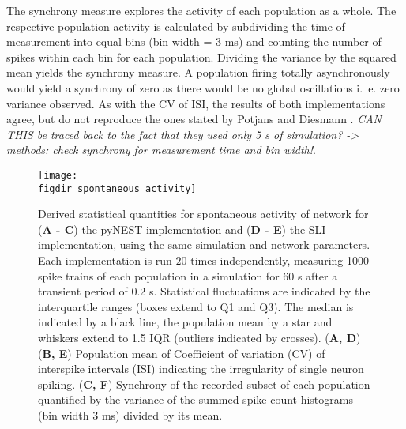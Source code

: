 The synchrony measure explores the activity of each population as a whole. The respective population
activity is calculated by subdividing the time of measurement into equal bins (bin width = $3$ ms) 
and counting the number of spikes within each bin for each population. 
Dividing the variance by the squared mean yields the synchrony measure. 
A population firing totally asynchronously would yield a synchrony of zero as there would 
be no global oscillations i.~e. zero variance observed.
As with the CV of ISI, the results of both implementations agree, but do not reproduce the ones stated 
by Potjans and Diesmann \cite{potjans2014}. \emph{CAN THIS be traced back to the fact that they used 
only 5 s of simulation? -> methods: check synchrony for measurement time and bin width!}. 
\begin{figure}[htpb]
    \centering
    \texttt{[image: \\figdir spontaneous\_activity]}
    \caption{
        Derived statistical quantities for spontaneous activity of network for
        (\textbf{A - C}) the pyNEST implementation and (\textbf{D - E}) the SLI implementation, 
        using the same simulation and network parameters.
        Each implementation is run $20$ times independently, 
        measuring 1000 spike trains of each population in a simulation for 60 s 
        after a transient period of 0.2 s. 
        Statistical fluctuations 
        are indicated by the interquartile ranges (boxes extend to Q1 and Q3). 
        The median is indicated by a black line, the population mean by a star and 
        whiskers extend to 1.5 IQR (outliers indicated by crosses). 
        \quad (\textbf{A, D}) 
        \quad (\textbf{B, E}) Population mean of Coefficient of variation (CV) of interspike intervals (ISI) indicating 
        the irregularity of single neuron spiking. 
        \quad (\textbf{C, F}) Synchrony of the recorded subset of each population quantified by the 
        variance of the summed spike count histograms (bin width 3 ms) divided by
        its mean. 
    }
    \label{fig:spontaneous_activity}
\end{figure}

